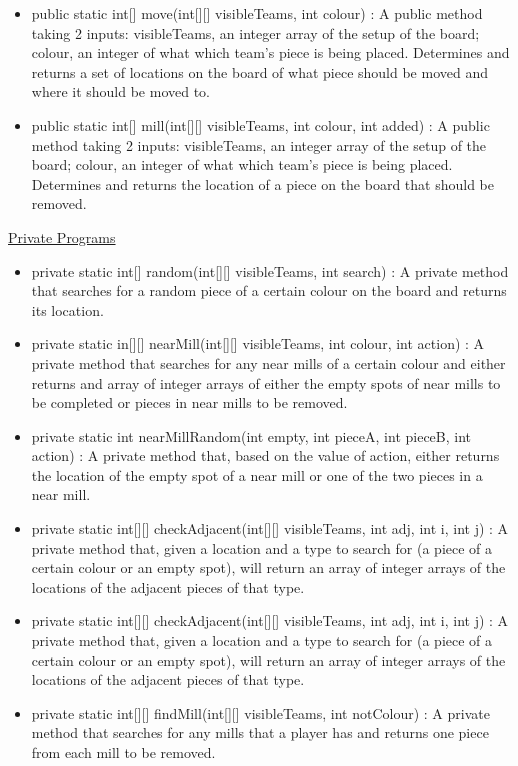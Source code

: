 \documentclass[12pt]{article}
\begin{document}
\begin{itemize}
\begin{itemize}
		\item public static int[] move(int[][] visibleTeams, int colour) : A public method taking 2 inputs: visibleTeams, an integer array of the setup of the board; colour, an integer of what which team’s piece is being placed. Determines and returns a set of locations on the board of what piece should be moved and where it should be moved to.
		\item public static int[] mill(int[][] visibleTeams, int colour, int added) : A public method taking 2 inputs: visibleTeams, an integer array of the setup of the board; colour, an integer of what which team’s piece is being placed. Determines and returns the location of a piece on the board that should be removed.
	\end{itemize}
	\underline{Private Programs}
	\begin{itemize}
		\item private static int[] random(int[][] visibleTeams, int search) : A private method that searches for a random piece of a certain colour on the board and returns its location.
		\item private static in[][] nearMill(int[][] visibleTeams, int colour, int action) : A private method that searches for any near mills of a certain colour and either returns and array of integer arrays of either the empty spots of near mills to be completed or pieces in near mills to be removed.
		\item private static int nearMillRandom(int empty, int pieceA, int pieceB, int action) : A private method that, based on the value of action, either returns the location of the empty spot of a near mill or one of the two pieces in a near mill.
		\item private static int[][] checkAdjacent(int[][] visibleTeams, int adj, int i, int j) : A private method that, given a location and a type to search for (a piece of a certain colour or an empty spot), will return an array of integer arrays of the locations of the adjacent pieces of that type.
		\item private static int[][] checkAdjacent(int[][] visibleTeams, int adj, int i, int j) : A private method that, given a location and a type to search for (a piece of a certain colour or an empty spot), will return an array of integer arrays of the locations of the adjacent pieces of that type.
		\item private static int[][] findMill(int[][] visibleTeams, int notColour) : A private method that searches for any mills that a player has and returns one piece from each mill to be removed.

\end{itemize}
\end{itemize}
\end{document}
